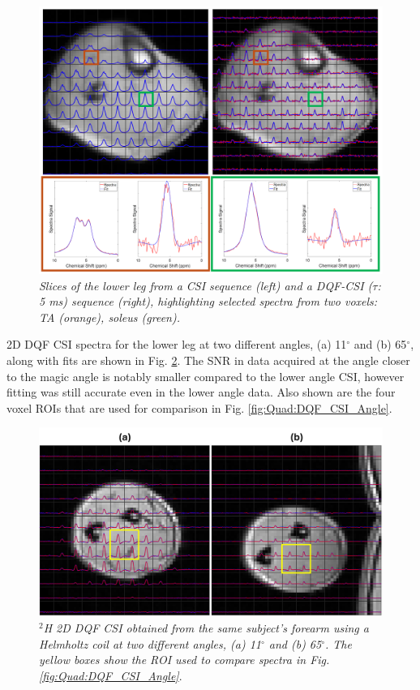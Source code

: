 \begin{figure}
    \centering
    \includegraphics[width=1\textwidth]{Figures/Quad/SQFDQF_CSI_2.png}
    \caption{\textit{Slices of the lower leg from a \ac{CSI} sequence (left) and a \ac{DQF}-\ac{CSI} ($\tau$: 5 ms) sequence (right), highlighting selected spectra from two voxels: \ac{TA} (orange), soleus (green).}}
    \label{fig:Quad:SQFDQF_2}
\end{figure}

2D \ac{DQF} \ac{CSI} spectra for the lower leg at two different angles, (a) 11$^\circ$ and (b) 65$^\circ$, along with fits are shown in Fig. \ref{fig:Quad:Arm_DQF}. The \ac{SNR} in data acquired at the angle closer to the magic angle is notably smaller compared to the lower angle \ac{CSI}, however fitting was still accurate even in the lower angle data. Also shown are the four voxel \ac{ROI}s that are used for comparison in Fig. \ref{fig:Quad:DQF_CSI_Angle}.

\begin{figure}
    \centering
    \includegraphics[width=1\textwidth]{Figures/Quad/Arm_DQF.png}
    \caption{\textit{$^2$H 2D \ac{DQF} \ac{CSI} obtained from the same subject's forearm using a Helmholtz coil at two different angles, (a) 11$^\circ$ and (b) 65$^\circ$. The yellow boxes show the \ac{ROI} used to compare spectra in Fig. \ref{fig:Quad:DQF_CSI_Angle}}.}
    \label{fig:Quad:Arm_DQF}
\end{figure}

